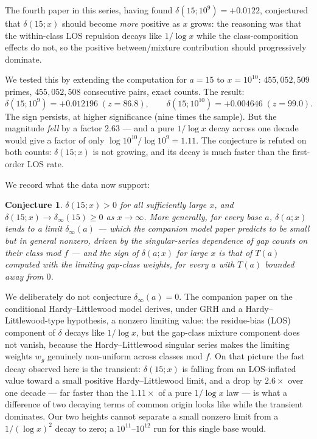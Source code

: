 \documentclass[11pt,reqno]{amsart}
\theoremstyle{plain}
\newtheorem{conjecture}[theorem]{Conjecture}
\theoremstyle{definition}
\begin{document}
The fourth paper in this series, having found $\delta(15;10^9) = +0.0122$,
conjectured that $\delta(15;x)$ should become \emph{more} positive as $x$
grows: the reasoning was that the within-class LOS repulsion decays like
$1/\log x$ while the class-composition effects do not, so the positive
between/mixture contribution should progressively dominate.

We tested this by extending the computation for $a = 15$ to $x = 10^{10}$:
$455{,}052{,}509$ primes, $455{,}052{,}508$ consecutive pairs, exact counts.
The result:
\[
  \delta(15;10^9) = +0.012196 \;(z = 86.8), \qquad
  \delta(15;10^{10}) = +0.004646 \;(z = 99.0).
\]
The sign persists, at higher significance (nine times the sample). But the
magnitude \emph{fell} by a factor $2.63$ --- and a pure $1/\log x$ decay
across one decade would give a factor of only
$\log 10^{10} / \log 10^{9} = 1.11$. The conjecture is refuted on both
counts: $\delta(15;x)$ is not growing, and its decay is much faster than the
first-order LOS rate.

We record what the data now support:

\begin{conjecture}
\label{conj:decay}
$\delta(15;x) > 0$ for all sufficiently large $x$, and
$\delta(15;x) \to \delta_\infty(15) \ge 0$ as $x \to \infty$. More
generally, for every base $a$, $\delta(a;x)$ tends to a limit
$\delta_\infty(a)$ --- which the companion model paper predicts to be small
but in general \emph{nonzero}, driven by the singular-series dependence of
gap counts on their class mod $f$ --- and the sign of $\delta(a;x)$ for
large $x$ is that of $T(a)$ computed with the limiting gap-class weights,
for every $a$ with $T(a)$ bounded away from $0$.
\end{conjecture}

We deliberately do not conjecture $\delta_\infty(a) = 0$. The companion
paper on the conditional Hardy--Littlewood model derives, under GRH and a
Hardy--Littlewood-type hypothesis, a nonzero limiting value: the
residue-bias (LOS) component of $\delta$ decays like $1/\log x$, but the
gap-class mixture component does not vanish, because the Hardy--Littlewood
singular series makes the limiting weights $w_g$ genuinely non-uniform
across classes mod $f$. On that picture the fast decay observed here is the
transient: $\delta(15;x)$ is falling from an LOS-inflated value toward a
small positive Hardy--Littlewood limit, and a drop by $2.6\times$ over one
decade --- far faster than the $1.11\times$ of a pure $1/\log x$ law --- is
what a difference of two decaying terms of common origin looks like while
the transient dominates. Our two heights cannot separate a small nonzero
limit from a $1/(\log x)^2$ decay to zero; a $10^{11}$--$10^{12}$ run for
this single base would.
\end{document}
